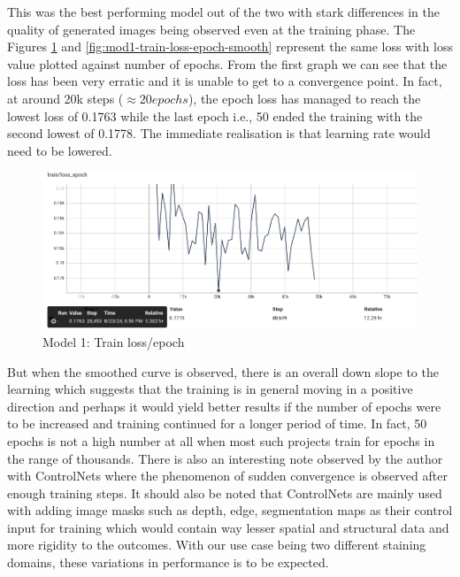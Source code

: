 This was the best performing model out of the two with stark differences in the quality of generated images being observed even at the training phase. The Figures \ref{fig:mod1-train-loss-epoch} and \ref{fig:mod1-train-loss-epoch-smooth} represent the same loss with loss value plotted against number of epochs. From the first graph we can see that the loss has been very erratic and it is unable to get to a convergence point. In fact, at around 20k steps ($\approx 20  epochs$), the epoch loss has managed to reach the lowest loss of 0.1763 while the last epoch i.e., 50 ended the training with the second lowest of 0.1778. The immediate realisation is that learning rate would need to be lowered.
\begin{figure}[h]
    \centering
    \includegraphics[width=1\linewidth]{5_Results/figures/var1-train-epoch-loss.png}
    \caption{Model 1: Train loss/epoch}
    \label{fig:mod1-train-loss-epoch}
\end{figure}
But when the smoothed curve is observed, there is an overall down slope to the learning which suggests that the training is in general moving in a positive direction and perhaps it would yield better results if the number of epochs were to be increased and training continued for a longer period of time. In fact, 50 epochs is not a high number at all when most such projects train for epochs in the range of thousands. There is also an interesting note observed by the author \parencite[Figure 4, p. 5]{Zhang2023AddingModels} with ControlNets where the phenomenon of sudden convergence is observed after enough training steps. It should also be noted that ControlNets are mainly used with adding image masks such as depth, edge, segmentation maps as their control input for training which would contain way lesser spatial and structural data and more rigidity to the outcomes. With our use case being two different staining domains, these variations in performance is to be expected. 
